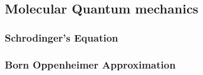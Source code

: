 \subsection{Molecular Quantum mechanics}
\subsubsection{Schrodinger's Equation}
\subsubsection{Born Oppenheimer Approximation}
